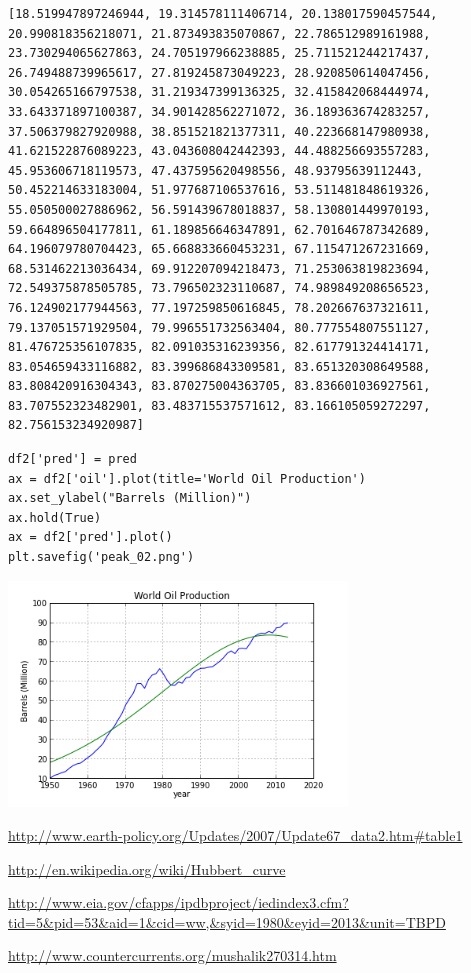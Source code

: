 \documentclass[12pt,fleqn]{article}\usepackage{../common}
\begin{document}
\begin{verbatim}
[18.519947897246944, 19.314578111406714, 20.138017590457544, 20.990818356218071, 21.873493835070867, 22.786512989161988, 23.730294065627863, 24.705197966238885, 25.711521244217437, 26.749488739965617, 27.819245873049223, 28.920850614047456, 30.054265166797538, 31.219347399136325, 32.415842068444974, 33.643371897100387, 34.901428562271072, 36.189363674283257, 37.506379827920988, 38.851521821377311, 40.223668147980938, 41.621522876089223, 43.043608042442393, 44.488256693557283, 45.953606718119573, 47.437595620498556, 48.93795639112443, 50.452214633183004, 51.977687106537616, 53.511481848619326, 55.050500027886962, 56.591439678018837, 58.130801449970193, 59.664896504177811, 61.189856646347891, 62.701646787342689, 64.196079780704423, 65.668833660453231, 67.115471267231669, 68.531462213036434, 69.912207094218473, 71.253063819823694, 72.549375878505785, 73.796502323110687, 74.989849208656523, 76.124902177944563, 77.197259850616845, 78.202667637321611, 79.137051571929504, 79.996551732563404, 80.777554807551127, 81.476725356107835, 82.091035316239356, 82.617791324414171, 83.054659433116882, 83.399686843309581, 83.651320308649588, 83.808420916304343, 83.870275004363705, 83.836601036927561, 83.707552323482901, 83.483715537571612, 83.166105059272297, 82.756153234920987]
\end{verbatim}

\begin{verbatim}
df2['pred'] = pred
ax = df2['oil'].plot(title='World Oil Production')
ax.set_ylabel("Barrels (Million)")
ax.hold(True)
ax = df2['pred'].plot()
plt.savefig('peak_02.png')
\end{verbatim}

\includegraphics[height=6cm]{peak_02.png}


\url{http://www.earth-policy.org/Updates/2007/Update67_data2.htm#table1}

\url{http://en.wikipedia.org/wiki/Hubbert_curve}

\url{http://www.eia.gov/cfapps/ipdbproject/iedindex3.cfm?tid=5&pid=53&aid=1&cid=ww,&syid=1980&eyid=2013&unit=TBPD}

\url{http://www.countercurrents.org/mushalik270314.htm}
\end{document}
